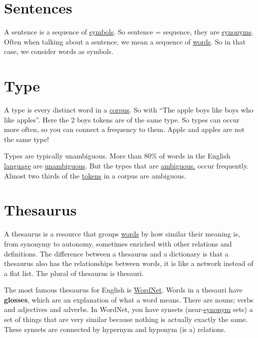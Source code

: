 \documentclass[
  11pt,
  british,
]{article}
\begin{document}
\hypertarget{sentences}{%
\section{Sentences}\label{sentences}}

A sentence is a sequence of \href{Symbol.md}{symbols}. So sentence =
sequence, they are \href{../Languages/Synonyms.md}{synonyms}. Often when
talking about a sentence, we mean a sequence of \href{Words.md}{words}.
So in that case, we consider words as symbols.

\hypertarget{type}{%
\section{Type}\label{type}}

A type is every distinct word in a \href{Corpus.md}{corpus}. So with
``The apple boys like boys who like apples''. Here the 2 boys tokens are
of the same type. So types can occur more often, so you can connect a
frequency to them. Apple and apples are not the same type!

Types are typically unambiguous. More than 80\% of words in the English
\href{../Languages/Languages.md}{language} are
\href{../Languages/Ambiguity.md}{unambiguous}. But the types that are
\href{../Languages/Ambiguity.md}{ambiguous.} occur frequently. Almost
two thirds of the \href{Token.md}{tokens} in a corpus are ambiguous.

\hypertarget{thesaurus}{%
\section{Thesaurus}\label{thesaurus}}

A thesaurus is a resource that groups \href{Words.md}{words} by how
similar their meaning is, from synonymy to autonomy, sometimes enriched
with other relations and definitions. The difference between a thesaurus
and a dictionary is that a thesaurus also has the relationships between
words, it is like a network instead of a flat list. The plural of
thesaurus is thesauri.

The most famous thesaurus for English is
\href{https://wordnet.princeton.edu}{WordNet}. Words in a thesauri have
\textbf{glosses}, which are an explanation of what a word means. There
are nouns; verbs and adjectives and adverbs. In WordNet, you have
synsets (near-\href{../Languages/Synonyms.md}{synonym} sets) a set of
things that are very similar because nothing is actually exactly the
same. These synsets are connected by hypernym and hyponym (is a)
relations.
\end{document}
